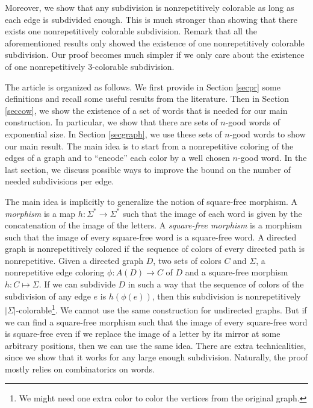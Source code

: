\documentclass[a4paper,12pt]{article}
\begin{document}
Moreover, we show that any subdivision is nonrepetitively colorable as long as each edge is subdivided enough. This is much stronger than showing that there exists one nonrepetitively colorable subdivision.  Remark that all the aforementioned results only showed the existence of one nonrepetitively colorable subdivision. Our proof becomes much simpler if we only care about the existence of one nonrepetitively $3$-colorable subdivision. 
 
The article is organized as follows. We first provide in Section \ref{secpr} some definitions and recall some useful results from the literature. Then in Section \ref{seccow}, we show the existence of a set of words that is needed for our main construction. In particular, we show that there are sets of $n$-good words of exponential size. In Section \ref{secgraph}, we use these sets of $n$-good words to show our main result. The main idea is to start from a nonrepetitive coloring of the edges of a graph and to ``encode'' each color by a well chosen $n$-good word. In the last section, we discuss possible ways to improve the bound on the number of needed subdivisions per edge.

The main idea is implicitly to generalize the notion of square-free morphism.
A \emph{morphism} is a map $h:\Sigma^*\rightarrow\Sigma^*$ such that the image of each word is given by the concatenation of the image of the letters.
A \emph{square-free morphism} is a morphism such that the image of every square-free word is a square-free word. 
A directed graph is nonrepetitively colored if the sequence of colors of every directed path is nonrepetitive.
Given a directed graph $D$, two sets of colors $C$ and $\Sigma$, a nonrepetitive edge coloring $\phi:A(D)\rightarrow C$ of $D$ and a square-free morphism $h:C\mapsto \Sigma$. 
If we can subdivide $D$ in such a way that the sequence of colors of the subdivision of any edge $e$ is $h(\phi(e))$, then this subdivision is nonrepetitively $|\Sigma|$-colorable\footnote{We might need one extra color to color the vertices from the original graph.}.
We cannot use the same construction for undirected graphs. But if we can find a square-free morphism such that the image of every square-free word is square-free even if we replace the image of a letter by its mirror at some arbitrary positions, then we can use the same idea.
There are extra technicalities, since we show that it works for any large enough subdivision.
Naturally, the proof mostly relies on combinatorics on words.

 
\end{document}
